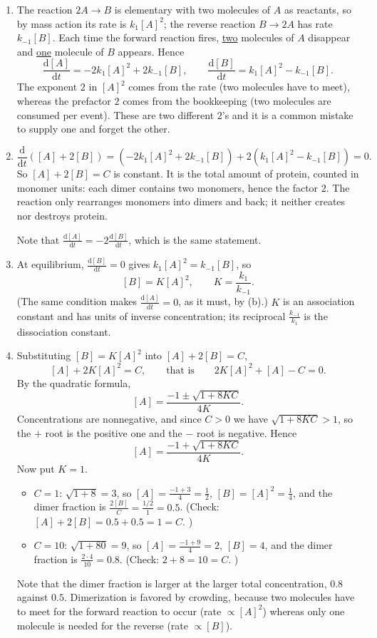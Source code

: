 \documentclass[a4paper,12pt]{article}
\begin{document}
\begin{enumerate}[label=(\alph*)]
\item The reaction $2A \to B$ is elementary with two molecules of $A$ as reactants, so by mass action its rate is $k_1 [A]^2$; the reverse reaction $B \to 2A$ has rate $k_{-1}[B]$. Each time the forward reaction fires, \underline{two} molecules of $A$ disappear and \underline{one} molecule of $B$ appears. Hence
\[
\frac{\text{d}[A]}{\text{d}t} = -2k_1[A]^2 + 2k_{-1}[B],
\qquad
\frac{\text{d}[B]}{\text{d}t} = k_1[A]^2 - k_{-1}[B] .
\]
The exponent $2$ in $[A]^2$ comes from the rate (two molecules have to meet), whereas the prefactor $2$ comes from the bookkeeping (two molecules are consumed per event). These are two different $2$'s and it is a common mistake to supply one and forget the other.

\item
\[ \frac{\text{d}}{\text{d}t}\left( [A]+2[B] \right) = \left( -2k_1[A]^2+2k_{-1}[B] \right) + 2\left( k_1[A]^2-k_{-1}[B] \right) = 0 . \]
So $[A]+2[B] = C$ is constant. It is the total amount of protein, counted in monomer units: each dimer contains two monomers, hence the factor $2$. The reaction only rearranges monomers into dimers and back; it neither creates nor destroys protein.

Note that $\frac{\text{d}[A]}{\text{d}t} = -2\frac{\text{d}[B]}{\text{d}t}$, which is the same statement.

\item At equilibrium, $\frac{\text{d}[B]}{\text{d}t}=0$ gives $k_1[A]^2 = k_{-1}[B]$, so
\[ [B] = K[A]^2, \qquad K = \frac{k_1}{k_{-1}} . \]
(The same condition makes $\frac{\text{d}[A]}{\text{d}t}=0$, as it must, by (b).) $K$ is an association constant and has units of inverse concentration; its reciprocal $\frac{k_{-1}}{k_1}$ is the dissociation constant.

\item Substituting $[B]=K[A]^2$ into $[A]+2[B]=C$,
\[ [A] + 2K[A]^2 = C, \qquad\text{that is}\qquad 2K[A]^2+[A]-C = 0 . \]
By the quadratic formula,
\[ [A] = \frac{-1 \pm \sqrt{1+8KC}}{4K} . \]
Concentrations are nonnegative, and since $C>0$ we have $\sqrt{1+8KC}>1$, so the $+$ root is the positive one and the $-$ root is negative. Hence
\[ [A] = \frac{-1+\sqrt{1+8KC}}{4K} . \]
Now put $K=1$.
\begin{itemize}
\item $C=1$: $\sqrt{1+8}=3$, so $[A]=\frac{-1+3}{4}=\frac{1}{2}$, $[B]=[A]^2=\frac{1}{4}$, and the dimer fraction is $\frac{2[B]}{C}=\frac{1/2}{1}=\boxed{0.5}$. (Check: $[A]+2[B]=0.5+0.5=1=C$. \checkmark)
\item $C=10$: $\sqrt{1+80}=9$, so $[A]=\frac{-1+9}{4}=2$, $[B]=4$, and the dimer fraction is $\frac{2\cdot 4}{10}=\boxed{0.8}$. (Check: $2+8=10=C$. \checkmark)
\end{itemize}
Note that the dimer fraction is larger at the larger total concentration, $0.8$ against $0.5$. Dimerization is favored by crowding, because two molecules have to meet for the forward reaction to occur (rate $\propto [A]^2$) whereas only one molecule is needed for the reverse (rate $\propto [B]$).


\end{enumerate}
\end{document}

